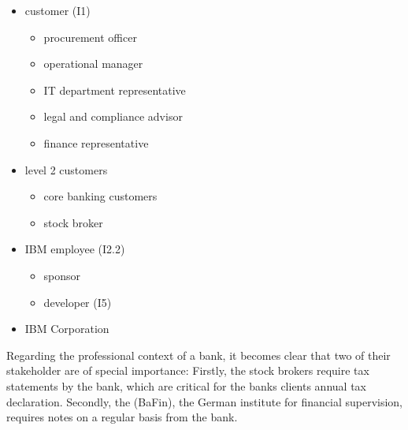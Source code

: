 \begin{multicols}{2}
\begin{itemize}
    \item customer (I1)
    \begin{itemize}
        \item procurement officer
        \item operational manager
        \item IT department representative
        \item legal and compliance advisor
        \item finance representative
    \end{itemize} \columnbreak
    \item level 2 customers
    \begin{itemize}
        \item core banking customers
        \item stock broker
    \end{itemize}
    \item IBM employee (I2.2)
    \begin{itemize}
        \item sponsor
        \item developer (I5)
    \end{itemize}
    \item IBM Corporation
\end{itemize}
\end{multicols}

Regarding the professional context of a bank, it becomes clear that two of their stakeholder are of special importance: Firstly, the stock brokers require tax statements by the bank, which are critical for the banks clients annual tax declaration. Secondly, the  (BaFin), the German institute for financial supervision, requires notes on a regular basis from the bank.

